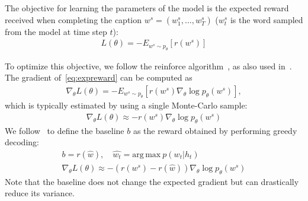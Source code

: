 The objective for learning the parameters of the model is the expected reward received when completing the caption $w^s=(w^s_1,\dots,w^s_T)$ ($w^s_t$ is the word sampled from the model at time step $t$):
\begin{equation}
\label{eq:expreward}
\begin{aligned}
L(\theta) = - E_{w^s\sim p_\theta}[r(w^s)]
 \end{aligned}
\end{equation}
\iffalse
Typically, the above expectation is approximated by taking a single sample from the model:
\begin{equation}
\begin{aligned}
L(\theta) \approx - r(w^s), \quad w^s \sim p_\theta
 \end{aligned}
\end{equation}
\fi
To optimize this objective, we follow the reinforce algorithm~\cite{RL1992}, as also used in~\cite{Selfcritical,Mixer}. The gradient of~\eqref{eq:expreward} can be computed as 
\begin{equation}
\begin{aligned}
\nabla_{\theta} L(\theta) = - E_{w^s\sim p_\theta}[r(w^s) \nabla_{\theta} \log p_\theta(w^s)],
 \end{aligned}
\end{equation}
which is typically estimated by using a single Monte-Carlo sample:
\begin{equation}
\begin{aligned}
\nabla_{\theta} L(\theta)  \approx   - r(w^s) \nabla_{\theta} \log p_\theta(w^s)
 \end{aligned}
\end{equation}
We follow~\cite{Selfcritical} to define the baseline $b$ as the reward obtained by performing greedy decoding: \begin{equation}
\begin{aligned}
&b =   r(\hat{w}), \quad \hat{w_t} = \mathrm{arg\,max}\ p(w_t|h_t)\\
&\nabla_{\theta} L(\theta)  \approx   - (r(w^s)-r(\hat{w}))\nabla_{\theta} \log p_\theta(w^s)
&
 \end{aligned}
\end{equation}
Note that the baseline does not change the expected gradient but can drastically reduce its variance.

